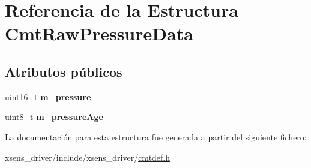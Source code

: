 \hypertarget{structCmtRawPressureData}{\section{\-Referencia de la \-Estructura \-Cmt\-Raw\-Pressure\-Data}
\label{structCmtRawPressureData}
}
\subsection*{\-Atributos públicos}
\begin{DoxyCompactItemize}
\item 
\hypertarget{structCmtRawPressureData_a0221ade8def8f21fb9373844a8239ed4}{uint16\-\_\-t {\bfseries m\-\_\-pressure}}\label{structCmtRawPressureData_a0221ade8def8f21fb9373844a8239ed4}

\item 
\hypertarget{structCmtRawPressureData_acb4bce77937084b7dae692f706764151}{uint8\-\_\-t {\bfseries m\-\_\-pressure\-Age}}\label{structCmtRawPressureData_acb4bce77937084b7dae692f706764151}

\end{DoxyCompactItemize}


\-La documentación para esta estructura fue generada a partir del siguiente fichero\-:\begin{DoxyCompactItemize}
\item 
xsens\-\_\-driver/include/xsens\-\_\-driver/\hyperlink{cmtdef_8h}{cmtdef.\-h}\end{DoxyCompactItemize}
